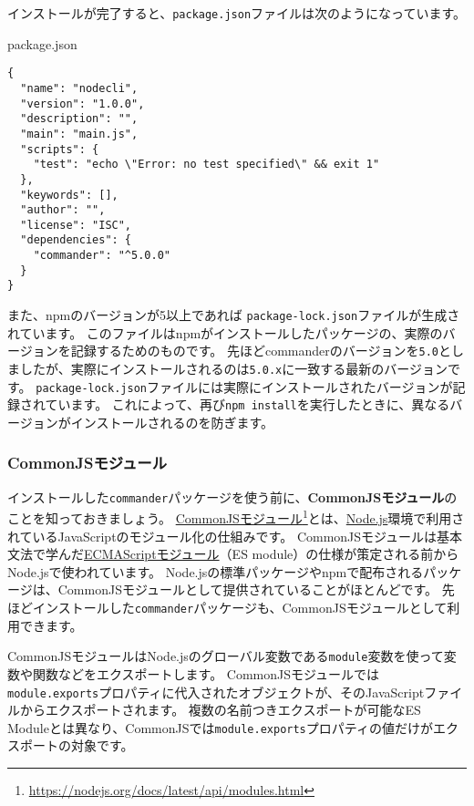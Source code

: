 インストールが完了すると、\texttt{package.json}ファイルは次のようになっています。

\begin{listtitle}
package.json
\end{listtitle}
\begin{lstlisting}
{
  "name": "nodecli",
  "version": "1.0.0",
  "description": "",
  "main": "main.js",
  "scripts": {
    "test": "echo \"Error: no test specified\" && exit 1"
  },
  "keywords": [],
  "author": "",
  "license": "ISC",
  "dependencies": {
    "commander": "^5.0.0"
  }
}
\end{lstlisting}
\listend

また、npmのバージョンが5以上であれば
\texttt{package-lock.json}ファイルが生成されています。
このファイルはnpmがインストールしたパッケージの、実際のバージョンを記録するためのものです。
先ほどcommanderのバージョンを\texttt{5.0}としましたが、実際にインストールされるのは\texttt{5.0.x}に一致する最新のバージョンです。
\texttt{package-lock.json}ファイルには実際にインストールされたバージョンが記録されています。
これによって、再び\texttt{npm install}を実行したときに、異なるバージョンがインストールされるのを防ぎます。

\hypertarget{commonjs-module}{%
\subsubsection{CommonJSモジュール}\label{commonjs-module}}

インストールした\texttt{commander}パッケージを使う前に、\textbf{CommonJSモジュール}のことを知っておきましょう。
\href{https://nodejs.org/docs/latest/api/modules.html}{CommonJSモジュール}\footnote{\url{https://nodejs.org/docs/latest/api/modules.html}}とは、\href{https://nodejs.org/ja/}{Node.js}環境で利用されているJavaScriptのモジュール化の仕組みです。
CommonJSモジュールは基本文法で学んだ\hyperlink{module}{ECMAScriptモジュール}（ES module）の仕様が策定される前からNode.jsで使われています。
Node.jsの標準パッケージやnpmで配布されるパッケージは、CommonJSモジュールとして提供されていることがほとんどです。
先ほどインストールした\texttt{commander}パッケージも、CommonJSモジュールとして利用できます。

CommonJSモジュールはNode.jsのグローバル変数である\texttt{module}変数を使って変数や関数などをエクスポートします。
CommonJSモジュールでは\texttt{module.exports}プロパティに代入されたオブジェクトが、そのJavaScriptファイルからエクスポートされます。
複数の名前つきエクスポートが可能なES
Moduleとは異なり、CommonJSでは\texttt{module.exports}プロパティの値だけがエクスポートの対象です。

